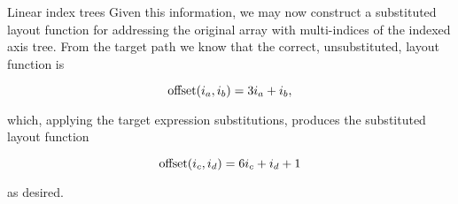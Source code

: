 \documentclass[thesis]{subfiles}
\begin{document}
\begin{example}{Linear index trees}
Given this information, we may now construct a substituted layout function for addressing the original array with multi-indices of the indexed axis tree.
From the target path we know that the correct, unsubstituted, layout function is

\begin{equation}
  \textnormal{offset}(i_a, i_b) = 3 i_a + i_b,
\end{equation}

\noindent
which, applying the target expression substitutions, produces the substituted layout function

\begin{equation}
  \textnormal{offset}(i_c, i_d) = 6 i_c + i_d + 1
\end{equation}

\noindent
as desired.

\end{example}
\end{document}
